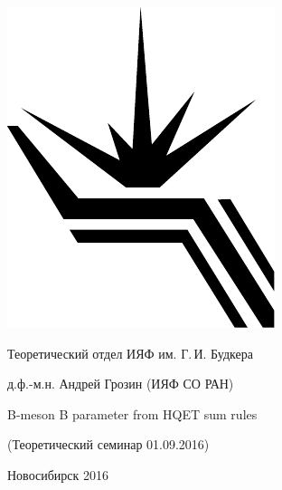 \documentclass[12pt,pagesize,paper=landscape,paper=192mm:108mm]{scrbook}
\begin{document}
\begin{titlepage}
  \vspace*{-0.5em}
  \begin{center}    
    \hspace*{3em}
    \begin{minipage}[t]{3em}
      \includegraphics[width=\textwidth]{../BINP-logo}
    \end{minipage}\hfill
    Теоретический отдел ИЯФ им. Г.\,И. Будкера\hfill
    \hspace*{7em}
    \bigskip

    \large
    д.ф.-м.н. Андрей Грозин  (ИЯФ СО РАН)
    \bigskip
    \bigskip

    \huge B-meson B parameter from HQET sum rules
    
    \bigskip
    \bigskip

    \normalsize
    (Теоретический семинар 01.09.2016)
    \vfill

    \normalsize

    \normalsize \ccbysa\hspace{0.5em}  Новосибирск 2016
  \end{center}
\end{titlepage}
\end{document}
